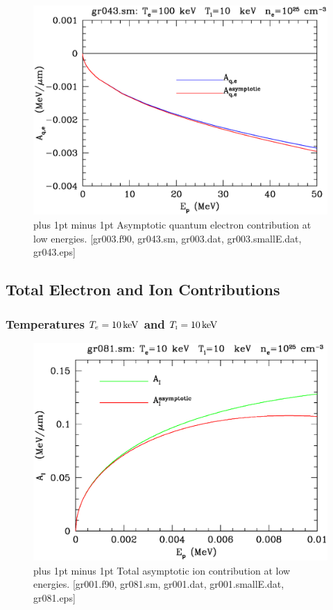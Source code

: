\documentclass[preprint,12pt,eqsecnum,nofootinbib,amsmath,amssymb]{revtex4}
\newcommand{\smI}{{\rm\scriptscriptstyle I}}
\newcommand{\footnoteskip}{\baselineskip 12pt plus 1pt minus 1pt}
\begin{document}
\vskip-2cm 
\begin{figure}[h!]
\includegraphics[scale=0.45]{gr043.eps} 
\vskip-0.8cm 
\caption{\footnoteskip  
  Asymptotic quantum electron contribution at low
  energies. [gr003.f90, gr043.sm, gr003.dat, gr003.smallE.dat,
  gr043.eps]
}
\label{fig:gr043}
\end{figure}



\pagebreak
\subsection{Total Electron and Ion Contributions}


\subsubsection{Temperatures $T_e=10\,{\rm keV}$ and $T_\smI=10\,{\rm keV}$}

\vskip-2cm 
\begin{figure}[h!]
\includegraphics[scale=0.45]{gr081.eps} 
\vskip-0.8cm 
\caption{\footnoteskip  
  Total asymptotic ion contribution at low energies. 
 [gr001.f90, gr081.sm,
    gr001.dat, gr001.smallE.dat, gr081.eps]
}
\label{fig:gr081}
\end{figure}
\end{document}
